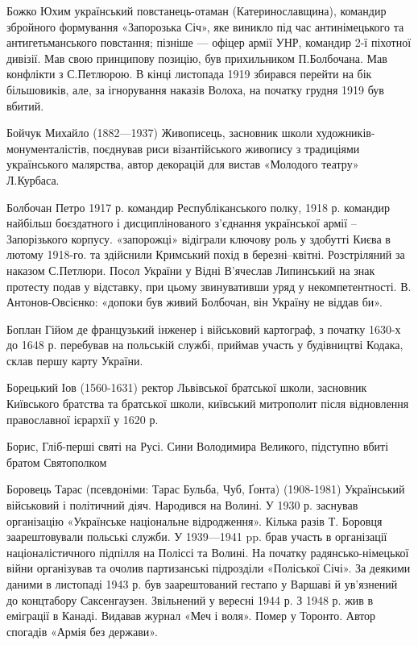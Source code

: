 Божко Юхим український повстанець-отаман (Катеринославщина), командир збройного формування «Запорозька Січ», яке виникло під час антинімецького та антигетьманського повстання; пізніше — офіцер армії УНР, командир 2-ї піхотної дивізії. Мав свою принципову позицію, був прихильником П.Болбочана. Мав конфлікти з С.Петлюрою. В кінці листопада 1919 збирався перейти на бік більшовиків, але, за ігнорування наказів Волоха, на початку грудня 1919 був вбитий.

Бойчук Михайло (1882—1937) Живописець, засновник школи художників-монументалістів, поєднував риси візантійського живопису з традиціями українського малярства, автор декорацій для вистав «Молодого театру» Л.Курбаса.

Болбочан Петро 1917 р. командир Республіканського полку, 1918 р. командир найбільш боєздатного і дисциплінованого з’єднання української армії – Запорізького корпусу. «запорожці» відіграли ключову роль у здобутті Києва в лютому 1918-го. та здійснили Кримський похід в березні–квітні. Розстріляний за наказом С.Петлюри. Посол України у Відні В’ячеслав Липинський на знак протесту подав у відставку, при цьому звинувативши уряд у некомпетентності. В. Антонов-Овсієнко: «допоки був живий Болбочан, він Україну не віддав би». 

Боплан Гійом де  французький інженер і військовий картограф, з початку 1630-х до 1648 р. перебував на польській службі, приймав участь у будівництві Кодака, склав першу карту України.

Борецький Іов  (1560-1631) ректор Львівської братської школи, засновник Київського братства та братської школи, київський митрополит після відновлення православної ієрархії у 1620 р.

Борис, Гліб-перші святі на Русі. Сини Володимира Великого, підступно вбиті братом Святополком

Боровець Тарас (псевдоніми: Тарас Бульба, Чуб, Ґонта) (1908-1981) Український військовий і політичний діяч. Народився на Волині. У 1930 р. заснував організацію «Українське національне відродження». Кілька разів Т. Боровця заарештовували польські служби. У 1939—1941 pp. брав участь в організації націоналістичного підпілля на Поліссі та Волині. На початку радянсько-німецької війни організував та очолив партизанські підрозділи «Поліської Січі». За деякими даними в листопаді 1943 р. був заарештований гестапо у Варшаві й ув'язнений до концтабору Саксенгаузен. Звільнений у вересні 1944 р. З 1948 р. жив в еміграції в Канаді. Видавав журнал «Меч і воля». Помер у Торонто. Автор спогадів «Армія без держави».

